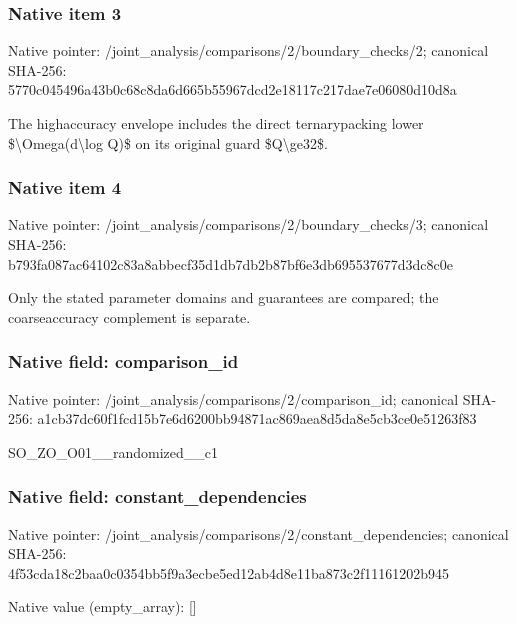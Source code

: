 \documentclass[10pt,a4paper]{article}
\begin{document}
\subsubsection{Native item 3}


Native pointer: /joint\_analysis/comparis\allowbreak{}ons/2/boundary\_checks/2; canonical SHA-256: 5770c045496a43b0c68c8da6\allowbreak{}d665b55967dcd2e18117c217\allowbreak{}dae7e06080d10d8a


The highaccuracy envelope includes the direct ternarypacking lower \$\textbackslash{}Omega(d\textbackslash{}log Q)\$ on its original guard \$Q\textbackslash{}ge32\$.


\subsubsection{Native item 4}


Native pointer: /joint\_analysis/comparis\allowbreak{}ons/2/boundary\_checks/3; canonical SHA-256: b793fa087ac64102c83a8abb\allowbreak{}ecf35d1db7db2b87bf6e3db6\allowbreak{}95537677d3dc8c0e


Only the stated parameter domains and guarantees are compared; the coarseaccuracy complement is separate.


\subsubsection{Native field: comparison\_id}


Native pointer: /joint\_analysis/comparis\allowbreak{}ons/2/comparison\_id; canonical SHA-256: a1cb37dc60f1fcd15b7e6d62\allowbreak{}00bb94871ac869aea8d5da8e\allowbreak{}5cb3ce0e51263f83


SO\_ZO\_O01\_\_randomized\_\_c1


\subsubsection{Native field: constant\_dependencies}


Native pointer: /joint\_analysis/comparis\allowbreak{}ons/2/constant\_dependenc\allowbreak{}ies; canonical SHA-256: 4f53cda18c2baa0c0354bb5f\allowbreak{}9a3ecbe5ed12ab4d8e11ba87\allowbreak{}3c2f11161202b945



Native value (empty\_array): []
\end{document}
